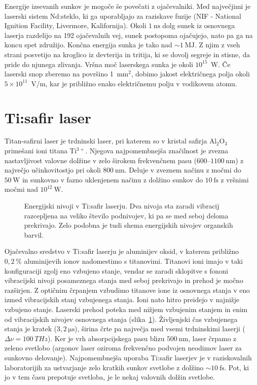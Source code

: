 \begin{remark}
Energije izsevanih sunkov je mogoče še povečati z ojačevalniki. Med največjimi je
laserski sistem Nd:steklo, ki ga uporabljajo za raziskave fuzije (NIF - National Ignition Facility, 
Livermore, Kalifornija).
Okoli $1~\si{\nano\second}$ dolg sunek iz osnovnega laserja razdelijo na 192
ojačevalnih vej, sunek postopoma ojačujejo, nato pa ga na koncu spet združijo.
Končna energija sunka je tako nad $\sim 1~\si{\mega\joule}$. Z njim z vseh strani posvetijo na
kroglico iz devterija in tritija, ki se dovolj segreje in stisne, da pride
do njunega zlivanja. Vršna moč laserskega sunka je okoli $10^{15}$~W. 
Če laserski snop zberemo na površino 1~mm$^2$, dobimo jakost električnega polja
okoli $5 \times 10^{11}$~V/m, kar je približno enako električnemu polju v vodikovem atomu.
\end{remark}

\section{Ti:safir laser}
Titan-safirni laser je trdninski laser, pri katerem so v kristal safirja
Al$_2$O$_3$ primešani ioni titana Ti$^{3+}$. Njegova najpomembnejša značilnost je
zvezna nastavljivost valovne dolžine v zelo širokem frekvenčnem pasu 
($600$--$1100~\si{\nano\metre}$) z največjo učinkovitostjo pri okoli $800~\si{\nano\metre}$. Deluje
v zveznem načinu z močmi do $50~\si{\watt}$ in sunkovno  v fazno uklenjenem načinu 
z dolžino sunkov do $10~\si{\femto\second}$ z vršnimi močmi nad $10^{12}~\si{\watt}$. 
\begin{figure}[h]
\centering
\def\svgwidth{90truemm} 

\caption{Energijski nivoji v Ti:safir laserju. Dva nivoja sta zaradi vibracij
razcepljena na veliko število podnivojev, ki pa se med seboj deloma prekrivajo.
Zelo podobna je tudi shema energijskih nivojev organskih barvil. 
}
\label{fig:TiE}
\end{figure} 

Ojačevalno sredstvo v Ti:safir laserju je aluminijev oksid, v katerem 
približno $0,2~\%$ aluminijevih ionov nadomestimo s titanovimi. Titanovi ioni imajo 
v taki konfiguraciji zgolj eno vzbujeno stanje, vendar se zaradi sklopitve s fononi
vibracijski nivoji posameznega stanja med seboj prekrivajo in prehod je močno razširjen. 
Z optičnim črpanjem vzbudimo titanove ione iz osnovnega stanja v eno izmed vibracijskih 
stanj vzbujenega stanja. Ioni nato hitro preidejo v najnižje vzbujeno stanje. 
Laserski prehod poteka med nižjem vzbujenim stanjem in enim od vibracijskih 
nivojev osnovnega stanja (slika~\ref{fig:TiE}). Življenjski čas
vzbujenega stanja je kratek ($3,2~\si{\micro\second}$), širina črte pa največja med
vsemi trdninskimi laserji ($\Delta \nu =  100~\si{THz}$). 
Ker je vrh absorpcijskega pasu blizu $500~\si{\nano\metre}$,
laser črpamo z zeleno svetlobo (argonov laser oziroma
frekvenčno podvojen neodimov laser za sunkovno delovanje). 
Najpomembnejša uporaba Ti:safir laserjev je v raziskovalnih laboratorijih za ustvarjanje zelo 
kratkih sunkov svetlobe z dolžino $\sim 10~\si{\femto\second}$. Pot, ki jo 
v tem času prepotuje svetloba, je le nekaj valovnih dolžin svetlobe. 

